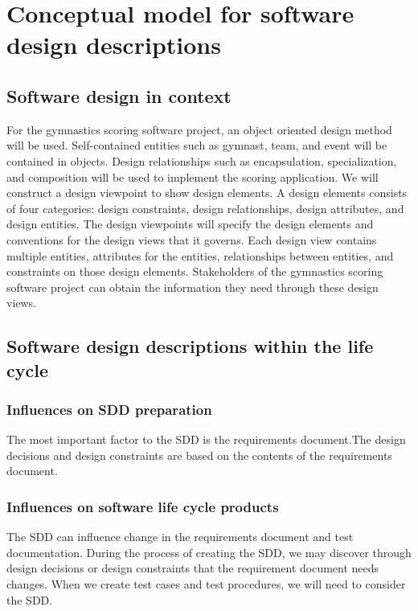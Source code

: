 \documentclass[letterpaper,10pt,draftclsnofoot,onecolumn,]{article}
\begin{document}

\section{Conceptual model for software design descriptions}

\subsection{Software design in context}
For the gymnastics scoring software project, an object oriented design method will be used. Self-contained entities such as gymnast, team, and event will be contained in objects. Design relationships such as encapsulation, specialization, and composition will be used to implement the scoring application. We will construct a design viewpoint to show design elements. A design elements consists of four categories: design constraints, design relationships, design attributes, and design entities. The design viewpoints will specify the design elements and conventions for the design views that it governs. Each design view contains multiple entities, attributes for the entities, relationships between entities, and constraints on those design elements. Stakeholders of the gymnastics scoring software project can obtain the information they need through these design views.
\subsection{Software design descriptions within the life cycle}
\subsubsection{Influences on SDD preparation}
The most important factor to the SDD is the requirements document.The design decisions and design constraints are based on the contents of the requirements document.
\subsubsection{Influences on software life cycle products}
The SDD can influence change in the requirements document and test documentation. During the process of creating the SDD, we may discover through design decisions or design constraints that the requirement document needs changes. When we create test cases and test procedures, we will need to consider the SDD.
\end{document}
